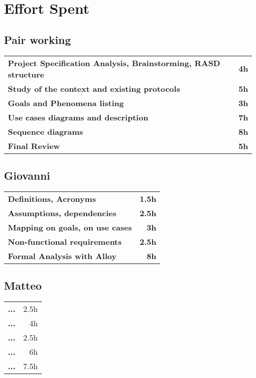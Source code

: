 \section{Effort Spent}
\subsection*{Pair working}
\begin{table}[H]
    \begin{tabular}{lr}
        \toprule
        \textbf{Project Specification Analysis, Brainstorming, RASD structure} & \textbf{4h} \\
        \textbf{Study of the context and existing protocols}                   & \textbf{5h} \\
        \textbf{Goals and Phenomena listing}                                   & \textbf{3h} \\
        \textbf{Use cases diagrams and description}                            & \textbf{7h} \\
        \textbf{Sequence diagrams}                                             & \textbf{8h} \\
        \textbf{Final Review}                                                  & \textbf{5h} \\
        \bottomrule
    \end{tabular}
\end{table}

\subsection*{Giovanni}
\begin{table}[H]
    \begin{tabular}{lr}
        \toprule
        \textbf{Definitions, Acronyms}          & \textbf{1.5h} \\
        \textbf{Assumptions, dependencies}      & \textbf{2.5h} \\
        \textbf{Mapping on goals, on use cases} & \textbf{3h}   \\
        \textbf{Non-functional requirements}    & \textbf{2.5h} \\
        \textbf{Formal Analysis with Alloy}     & \textbf{8h}   \\
        \bottomrule
    \end{tabular}
\end{table}

\subsection*{Matteo}
\begin{table}[H]
    \begin{tabular}{lr}
        \toprule
        \textbf{...} & 2.5h \\
        \textbf{...} & 4h   \\
        \textbf{...} & 2.5h \\
        \textbf{...} & 6h   \\
        \textbf{...} & 7.5h \\
        \bottomrule
    \end{tabular}
\end{table}

